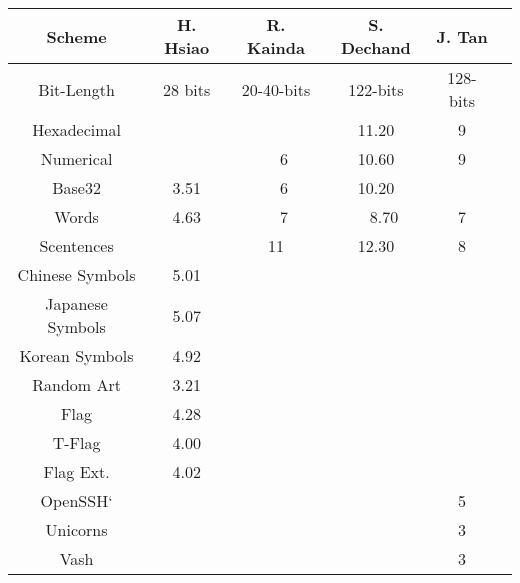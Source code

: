 \begin{tabular}{c|ccccc}
    \toprule
    \textbf{Scheme} 
    & \textbf{H. Hsiao}\cite{hsiao2009study}      
    & \textbf{R. Kainda}\cite{kainda2009usability}      
    & \textbf{S. Dechand}\cite{dechand2016empirical}
    & \textbf{J. Tan}\cite{tan2017can}      
    \\\hline
    Bit-Length      & 28 bits   & 20-40-bits & 122-bits & 128-bits
    \\\hline
    Hexadecimal     &           &        & 11.20   & 9\\
    Numerical       &           & ~~6    & 10.60   & 9\\
    Base32          & 3.51      & ~~6    & 10.20   & \\
    Words           & 4.63      & ~~7    & ~~8.70    & 7 \\
    Scentences      &           & 11     & 12.30   & 8 \\
    Chinese Symbols & 5.01      &           &         & \\
    Japanese Symbols& 5.07      &           &         & \\
    Korean Symbols  & 4.92   &           &         & \\
    \midrule
    Random Art	     & 3.21   &&&&\\
    Flag    	     & 4.28   &&&&\\
    T-Flag  	     & 4.00   &&&&\\
    Flag Ext.	     & 4.02   &&&&\\
    OpenSSH`         &&&& 5 &\\
    Unicorns         &&&& 3 &\\
    Vash             &&&& 3 &\\
    \bottomrule
\end{tabular}